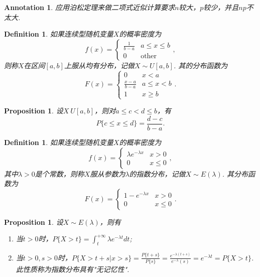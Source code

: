\documentclass{article}
\newtheorem{proposition}[theorem]{Proposition}
\newtheorem{definition}[theorem]{Definition}
\newtheorem{annotation}[theorem]{Annotation}
\begin{document}
\begin{annotation}
\rm 应用泊松定理来做二项式近似计算要求$n$较大，$p$较少，并且$np$不太大.
\end{annotation}

\begin{definition}
\rm 如果连续型随机变量$X$的概率密度为
$$
f(x) = \left\{\begin{array}{ll}
\frac{1}{b-a} & a \leq x \leq b\\
0 & \text{other}
\end{array}\right.,
$$
则称$X$在区间$[a,b]$上服从均有分布，记做$X \sim U[a,b]$. 其的分布函数为
$$
F(x) = \left\{\begin{array}{ll}
0 & x < a \\
\frac{x-a}{b-a} & a \leq x < b\\
1 & x \geq b
\end{array}\right..
$$
\end{definition}

\begin{proposition}
\rm 设$X~U[a,b]$，则对$a \leq c < d \leq b$，有
$$
P\{c\leq x \leq d\} = \frac{d-c}{b-a}.
$$
\end{proposition}

\begin{definition}
\rm 如果连续型随机变量$X$的概率密度为
$$
f(x) = \left\{ \begin{array}{ll}
\lambda e^{-\lambda x} & x > 0 \\
0 & x \leq 0
\end{array}\right.,
$$
其中$\lambda > 0$是个常数，则称$X$服从参数为$\lambda$的指数分布，记做$X \sim E(\lambda)$. 其分布函数为
$$
F(x) = \left\{\begin{array}{ll}
1 - e^{-\lambda x} & x > 0 \\
0 & x \leq 0
\end{array}\right..
$$
\end{definition}

\begin{proposition}
\rm 设$X \sim E(\lambda)$，则有
\begin{enumerate}
	\item 当$t > 0$时，$P\{X > t\} = \int_t^{+\infty} \lambda e^{-\lambda t}dt$;
	\item 当$t > 0, s >0$时，$P\{X > t+s |x > s\} = \frac{P\{t+s\}}{P\{s\}} = \frac{e^{-\lambda(t+s)}}{e^{-\lambda}(s)} = e^{-\lambda t} = P\{X > t\}$. 此性质称为指数分布具有"无记忆性". 
\end{enumerate}
\end{proposition}
\end{document}

